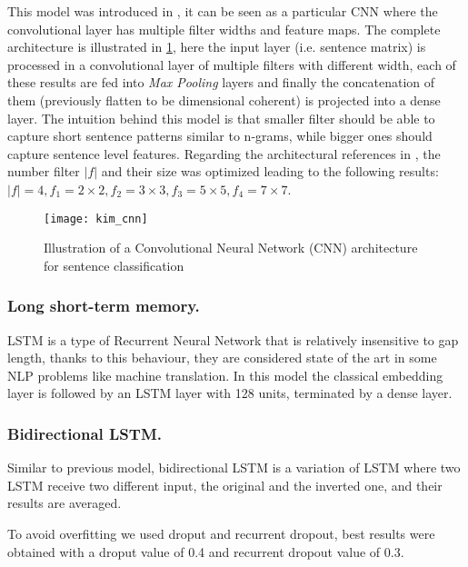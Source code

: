 This model was introduced in \cite{kim2014convolutional}, it can be seen as a particular CNN where the convolutional layer has multiple filter widths and feature maps.
The complete architecture is illustrated in \cref{fig:kim}, here the input layer (i.e. sentence matrix) is processed in a convolutional layer of multiple filters with different width, each of these results are fed into \emph{Max Pooling} layers and finally the concatenation of them (previously flatten to be dimensional coherent) is projected into a dense layer.
The intuition behind this model is that smaller filter should be able to capture short sentence patterns similar to n-grams, while bigger ones should capture sentence level features.
Regarding the architectural references in \cite{kim2014convolutional}, the number filter $|f|$ and their size was optimized leading to the following results: $|f| = 4, f_1 = 2\times2, f_2 = 3\times3, f_3 = 5\times5, f_4 = 7\times7$.

\begin{figure}[h]
\footnotesize
\centering
\texttt{[image: kim\_cnn]}
\caption{\cite{zhang2015sensitivity} Illustration of a Convolutional Neural Network (CNN) architecture for sentence classification}
\label{fig:kim}
\end{figure}



\subsubsection{Long short-term memory.}
LSTM is a type of Recurrent Neural Network that is relatively insensitive to gap length, thanks to this behaviour, they are considered state of the art in some NLP problems like machine translation.
In this model the classical embedding layer is followed by an LSTM layer with 128 units, terminated by a dense layer.

\subsubsection{Bidirectional LSTM.} Similar to previous model, bidirectional LSTM is a variation of LSTM where two LSTM receive two different input, the original and the inverted one, and their results are averaged.

To avoid overfitting we used droput and recurrent dropout, best results were obtained with a droput value of 0.4 and recurrent dropout value of 0.3.

